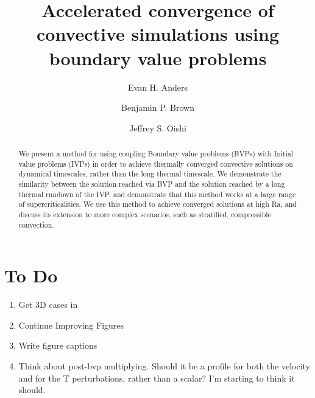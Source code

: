 \documentclass[aps, pre, onecolumn, nofootinbib, notitlepage, groupedaddress, amsfonts, amssymb, amsmath, longbibliography]{revtex4-1}
\begin{document}
\author{Evan H. Anders}
\author{Benjamin P. Brown}
\author{Jeffrey S. Oishi}
\title{Accelerated convergence of convective simulations using boundary value problems}

\begin{abstract}
We present a method for using coupling Boundary value problems (BVPs) with Initial value problems (IVPs)
in order to achieve thermally converged convective solutions on dynamical timescales, rather than the
long thermal timescale.  We demonstrate the similarity between the solution reached via BVP and the
solution reached by a long thermal rundown of the IVP, and demonstrate that this method works at a
large range of supercriticalities.  We use this method to achieve converged solutions at high Ra,
and discuss its extension to more complex scenarios, such as stratified, compressible convection.
\end{abstract}
\maketitle

\section{To Do}
\begin{enumerate}
\item Get 3D cases in
\item Continue Improving Figures
\item Write figure captions
\item Think about post-bvp multiplying.  Should it be a profile for both the velocity
and for the T perturbations, rather than a scalar?  I'm starting to think it should.
\end{enumerate}
\end{document}
